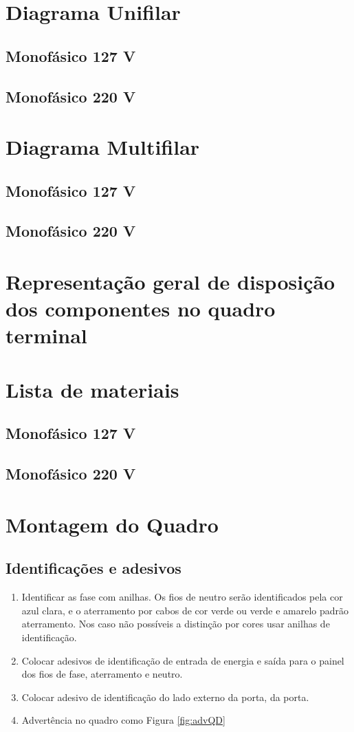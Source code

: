 \section{Diagrama Unifilar}
\subsection{Monofásico 127 V}
\subsection{Monofásico 220 V}

\section{Diagrama Multifilar}
\subsection{Monofásico 127 V}
\subsection{Monofásico 220 V}

\section{Representação geral de disposição dos componentes no quadro terminal}

\section{Lista de materiais}
\subsection{Monofásico 127 V}
\subsection{Monofásico 220 V}

\section{Montagem do Quadro}

\subsection{Identificações e adesivos}
\begin{enumerate}
\item Identificar as fase com anilhas. Os fios de neutro serão identificados pela cor azul clara, e o aterramento por cabos de cor verde ou verde e amarelo padrão aterramento. Nos caso não possíveis a distinção por cores usar anilhas de identificação.
\item Colocar adesivos de identificação de entrada de energia e saída para o painel dos fios de fase, aterramento e neutro.
\item  Colocar adesivo de identificação do lado externo da porta, da porta.
\item Advertência no quadro como Figura \ref{fig:advQD}
\end{enumerate}


